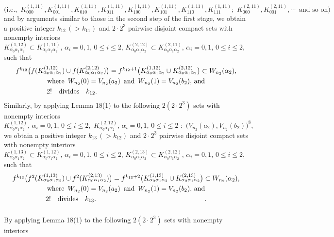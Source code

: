 \documentclass[12pt]{article}
\newcommand{\al}{\alpha}
\begin{document}
$$
\big(\text{i.e.,} \,\,\, K_{000}^{(1,11)}, K_{001}^{(1,11)}, K_{010}^{(1,11)}, K_{011}^{(1,11)}, K_{100}^{(1,11)}, K_{101}^{(1,11)}, K_{110}^{(1,11)}, K_{111}^{(1,11)}; \,\, K_{000}^{(2,11)}, K_{001}^{(2,11)}, \cdots \,\,\, \text{and so on}\big)
$$
and by arguments similar to those in the second step of the first stage, we obtain a positive integer $k_{12} \, (> k_{11})$ and $2 \cdot 2^3$ pairwise disjoint compact sets with nonempty interiors $K_{\al_0\al_1\al_2}^{(1,12)} \subset K_{\al_0\al_1\al_2}^{(1,11)}, \, \al_i = 0, 1, \, 0 \le i \le 2, \, K_{\al_0\al_1\al_2}^{(2,12)} \subset K_{\al_0\al_1\al_2}^{(2,11)}, \, \al_i = 0, 1, \, 0 \le i \le 2$, such that 
\begin{multline*}
$$
f^{k_{12}}\big(f(K_{\al_0\al_1\al_2}^{(1,12)}) \cup f(K_{\al_0\al_1\al_2}^{(2,12)})\big) = f^{k_{12}+1}\big(K_{\al_0\al_1\al_2}^{(1,12)} \cup K_{\al_0\al_1\al_2}^{(2,12)}\big) \subset W_{n_2}(\al_2), \\ 
\text{where} \,\,\, W_{n_2}(0) = V_{n_2}(a_2) \,\,\, \text{and} \,\,\, W_{n_2}(1) = V_{n_2}(b_2), \, \text{and} \\
2! \quad \text{divides} \quad k_{12}. \qquad\qquad\qquad\qquad\qquad\qquad\qquad\qquad
$$
\end{multline*}
\indent Similarly, by applying Lemma 18(1) to the following $2(2 \cdot 2^3)$ sets with nonempty interiors 
$$
K_{\al_0\al_1\al_2}^{(1,12)}, \, \al_i = 0, 1, \, 0 \le i \le 2, \,\, K_{\al_0\al_1\al_2}^{(2,12)}, \, \al_i = 0, 1, \, 0 \le i \le 2 \,\, : \,\, \big(V_{n_2}(a_2), V_{n_2}(b_2)\big)^8,
$$
we obtain a positive integer $k_{13} \, (> k_{12})$ and $2 \cdot 2^3$ pairwise disjoint compact sets with nonempty interiors $K_{\al_0\al_1\al_2}^{(1,13)} \subset K_{\al_0\al_1\al_2}^{(1,12)}, \, \al_i = 0, 1, \, 0 \le i \le 2, \, K_{\al_0\al_1\al_2}^{(2,13)} \subset K_{\al_0\al_1\al_2}^{(2,12)}, \, \al_i = 0, 1, \, 0 \le i \le 2$, such that 
\begin{multline*}
$$
f^{k_{13}}\big(f^2(K_{\al_0\al_1\al_2}^{(1,13)}) \cup f^2(K_{\al_0\al_1\al_2}^{(2,13)})\big) = f^{k_{13}+2}\big(K_{\al_0\al_1\al_2}^{(1,13)} \cup K_{\al_0\al_1\al_2}^{(2,13)}\big) \subset W_{n_2}(\al_2), \\ \text{where} \,\,\, W_{n_2}(0) = V_{n_2}(a_2) \,\,\, \text{and} \,\,\, W_{n_2}(1) = V_{n_2}(b_2), \, \text{and} \\
2! \quad \text{divides} \quad k_{13}. \qquad\qquad\qquad\qquad\qquad\qquad\qquad\qquad.\vspace{.15in}
$$
\end{multline*}
\indent By applying Lemma 18(1) to the following $2(2 \cdot 2^3)$ sets with nonempty interiors 
\end{document}
